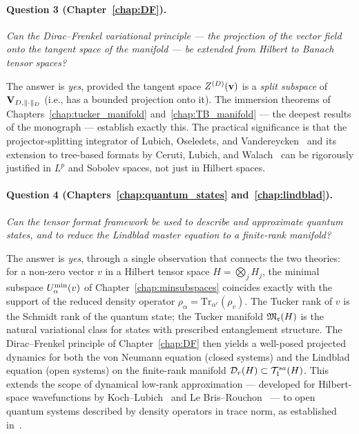 \paragraph{Question 3 (Chapter~\ref{chap:DF}).}
\emph{Can the Dirac--Frenkel variational principle — the projection
of the vector field onto the tangent space of the manifold — be
extended from Hilbert to Banach tensor spaces?}

The answer is \emph{yes}, provided the tangent space $Z^{(D)}(\mathbf{v})$ is a
\emph{split subspace} of $\mathbf{V}_{D,\|\cdot\|_D}$ (i.e., has a bounded projection
onto it). The immersion theorems of Chapters~\ref{chap:tucker_manifold}
and~\ref{chap:TB_manifold} — the deepest results of the monograph —
establish exactly this. The practical significance is that the
projector-splitting integrator of Lubich, Oseledets, and
Vandereycken~\cite{LubichOseledetsVandereycken2015} and its extension
to tree-based formats by Ceruti, Lubich, and
Walach~\cite{CerutiLubichWalach2020} can be rigorously justified in
$L^p$ and Sobolev spaces, not just in Hilbert spaces.

\paragraph{Question 4 (Chapters~\ref{chap:quantum_states}
and~\ref{chap:lindblad}).}
\emph{Can the tensor format framework be used to describe and approximate
quantum states, and to reduce the Lindblad master equation to a
finite-rank manifold?}

The answer is \emph{yes}, through a single observation that connects
the two theories: for a non-zero vector $v$ in a Hilbert tensor space
$H = \bigotimes_j H_j$, the minimal subspace $U^{\min}_{\alpha}(v)$ of
Chapter~\ref{chap:minsubspaces} coincides exactly with the support of
the reduced density operator $\rho_\alpha = \mathrm{Tr}_{\alpha^c}(\rho_v)$.
The Tucker rank of $v$ is the Schmidt rank of the quantum state; the
Tucker manifold $\mathfrak{M}_{\mathfrak{r}}(H)$ is the natural variational class for
states with prescribed entanglement structure. The Dirac--Frenkel
principle of Chapter~\ref{chap:DF} then yields a well-posed projected
dynamics for both the von Neumann equation (closed systems) and the
Lindblad equation (open systems) on the finite-rank manifold
$\mathcal{D}_{r}(H) \subset \mathcal{T}_{1}^{sa}(H)$. This extends the scope of
dynamical low-rank approximation — developed for Hilbert-space
wavefunctions by Koch--Lubich~\cite{KochLubich2007} and Le Bris--Rouchon~\cite{LeBrisRouchon2013} —
to open quantum systems described by density operators in trace norm,
as established in~\cite{AcevedoFalco2026}.

